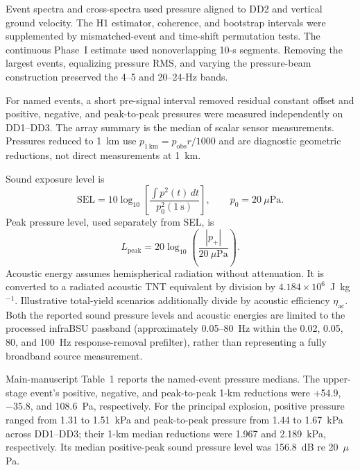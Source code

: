 \documentclass[]{seismica}
\begin{document}
Event spectra and cross-spectra used pressure aligned to DD2 and vertical
ground velocity. The H1 estimator, coherence, and bootstrap intervals were
supplemented by mismatched-event and time-shift permutation tests. The
continuous Phase~I estimate used nonoverlapping 10-s segments. Removing the
largest events, equalizing pressure RMS, and varying the pressure-beam
construction preserved the 4--5 and 20--24-Hz bands.

For named events, a short pre-signal interval removed residual constant offset
and positive, negative, and peak-to-peak pressures were measured independently
on DD1--DD3. The array summary is the median of scalar sensor measurements.
Pressures reduced to 1~km use $p_{1\,\mathrm{km}}=p_{\mathrm{obs}}r/1000$ and
are diagnostic geometric reductions, not direct measurements at 1~km.

Sound exposure level is
\begin{equation}
 \mathrm{SEL}=10\log_{10}\left[
 \frac{\int p^2(t)\,dt}{p_0^2(1~\mathrm{s})}\right],
 \qquad p_0=20~\mu\mathrm{Pa}.
\end{equation}
Peak pressure level, used separately from SEL, is
\begin{equation}
 L_{\mathrm{peak}}=20\log_{10}\left(\frac{|p_+|}{20~\mu\mathrm{Pa}}\right).
\end{equation}
Acoustic energy assumes hemispherical radiation without attenuation. It is
converted to a radiated acoustic TNT equivalent by division by
$4.184\times10^6$~J~kg$^{-1}$. Illustrative total-yield scenarios additionally
divide by acoustic efficiency $\eta_{\mathrm{ac}}$. Both the reported sound
pressure levels and acoustic energies are limited to the processed infraBSU
passband (approximately 0.05--80~Hz within the 0.02, 0.05, 80, and 100~Hz
response-removal prefilter), rather than representing a fully broadband source
measurement.

Main-manuscript Table~1 reports the named-event pressure medians. The
upper-stage event's positive, negative, and peak-to-peak 1-km reductions were
+54.9, $-35.8$, and 108.6~Pa, respectively. For the principal explosion,
positive pressure ranged from 1.31 to 1.51~kPa and peak-to-peak pressure from
1.44 to 1.67~kPa across DD1--DD3; their 1-km median reductions were 1.967 and
2.189~kPa, respectively. Its median positive-peak sound pressure level was
156.8~dB re 20~$\mu$Pa.
\end{document}
